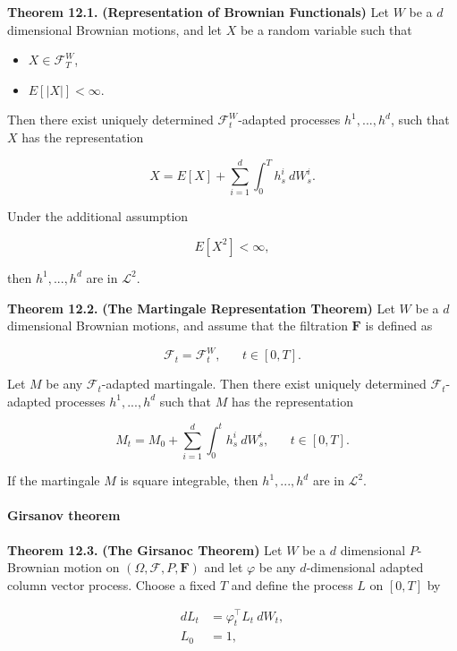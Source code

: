 \documentclass[
]{article}
\providecommand{\tightlist}{%
  \setlength{\itemsep}{0pt}\setlength{\parskip}{0pt}}
\begin{document}
\textbf{Theorem 12.1.} \textbf{(Representation of Brownian Functionals)}
Let \(W\) be a \(d\) dimensional Brownian motions, and let \(X\) be a
random variable such that

\begin{itemize}
\tightlist
\item
  \(X\in\mathcal{F}^W_T\),
\item
  \(E[\vert X\vert]<\infty\).
\end{itemize}

Then there exist uniquely determined \(\mathcal{F}^W_t\)-adapted
processes \(h^1,...,h^d\), such that \(X\) has the representation

\[
X=E[X]+\sum_{i=1}^d\int_0^Th^i_s\ dW_s^i.
\]

Under the additional assumption

\[
E[X^2]<\infty,
\]

then \(h^1,...,h^d\) are in \(\mathcal{L}^2\).

\textbf{Theorem 12.2.} \textbf{(The Martingale Representation Theorem)}
Let \(W\) be a \(d\) dimensional Brownian motions, and assume that the
filtration \(\mathbf{F}\) is defined as

\[
\mathcal{F}_t=\mathcal{F}^W_t,\hspace{20pt}t\in[0,T].
\]

Let \(M\) be any \(\mathcal{F}_t\)-adapted martingale. Then there exist
uniquely determined \(\mathcal{F}_t\)-adapted processes \(h^1,...,h^d\)
such that \(M\) has the representation

\[
M_t=M_0+\sum_{i=1}^d\int_0^t h_s^i\ dW_s^i,\hspace{20pt}t\in[0,T].
\]

If the martingale \(M\) is square integrable, then \(h^1,...,h^d\) are
in \(\mathcal{L}^2\).

\hypertarget{girsanov-theorem}{%
\paragraph{Girsanov theorem}\label{girsanov-theorem}}

\textbf{Theorem 12.3.} \textbf{(The Girsanoc Theorem)} Let \(W\) be a
\(d\) dimensional \(P\)-Brownian motion on
\((\Omega,\mathcal{F},P,\mathbf{F})\) and let \(\varphi\) be any
\(d\)-dimensional adapted column vector process. Choose a fixed \(T\)
and define the process \(L\) on \([0,T]\) by

\begin{align*}
dL_t&=\varphi^\top_t L_t\ dW_t,\\
L_0&=1,
\end{align*}
\end{document}
